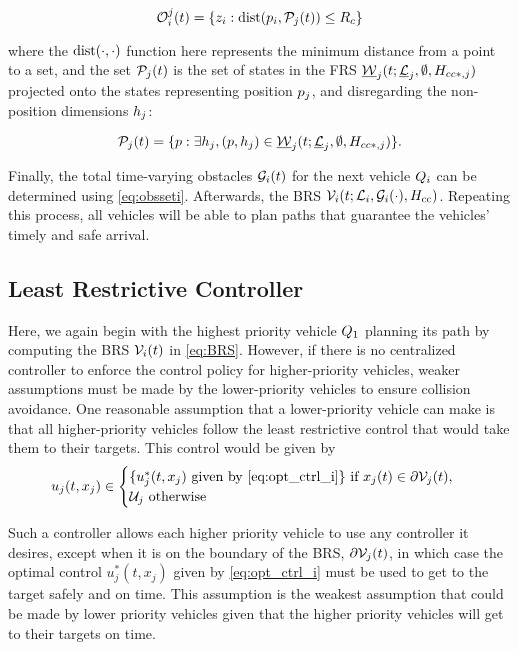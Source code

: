 \begin{equation}
\mathcal{O}_i^j(t) = \{z_i: \text{dist}(p_i, \mathcal{P}_j(t)) \le R_c \}
\end{equation}

\noindent where the $\text{dist}(\cdot, \cdot)$ function here represents the minimum distance from a point to a set, and the set $\mathcal{P}_j(t)$ is the set of states in the FRS $\underline{\mathcal{W}}_j(t; \underline{\mathcal{L}}_j, \emptyset, H_{cc*,j})$ projected onto the states representing position $p_j$, and disregarding the non-position dimensions $h_j$:

\begin{equation}
\mathcal{P}_j(t) = \{p: \exists h_j, (p, h_j) \in \underline{\mathcal{W}}_j(t; \underline{\mathcal{L}}_j, \emptyset, H_{cc*,j})\}.
\end{equation}

Finally, the total time-varying obstacles $\mathcal{G}_i(t)$ for the next vehicle $Q_{i}$ can be determined using \eqref{eq:obsseti}. Afterwards, the BRS $\mathcal{V}_i(t; \mathcal{L}_i, \mathcal{G}_i(\cdot), H_{\text{cc}})$. Repeating this process, all vehicles will be able to plan paths that guarantee the vehicles' timely and safe arrival.

\subsection{Least Restrictive Controller}  \label{sec:incomp_LRctrl}
Here, we again begin with the highest priority vehicle $Q_{1}$ planning its path by computing the BRS $\mathcal{V}_i(t)$ in \eqref{eq:BRS}. However, if there is no centralized controller to enforce the control policy for higher-priority vehicles, weaker assumptions must be made by the lower-priority vehicles to ensure collision avoidance. One reasonable assumption that a lower-priority vehicle can make is that all higher-priority vehicles follow the least restrictive control that would take them to their targets. This control would be given by 
\vspace{-0.4em}
\begin{equation}
\label{eq:lrctrl} %
u_j(t, x_j)\in \begin{cases} \{u_j^*(t, x_j) \text{ given by } \eqref{eq:opt_ctrl_i}\} \text{ if } x_j(t)\in \partial \brs_j(t), \\
\cset_j  \text{ otherwise}
\end{cases}
\end{equation}

Such a controller allows each higher priority vehicle to use any controller it desires, except when it is on the boundary of the BRS, $\partial \mathcal{V}_j(t)$, in which case the optimal control $u_j^*(t, x_j)$ given by \eqref{eq:opt_ctrl_i} must be used to get to the target safely and on time. This assumption is the weakest assumption that could be made by lower priority vehicles given that the higher priority vehicles will get to their targets on time.

